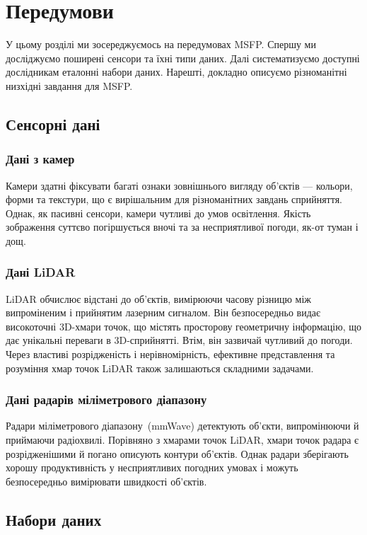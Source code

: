 \section{Передумови}
\label{s:background}

У цьому розділі ми зосереджуємось на передумовах MSFP. Спершу ми досліджуємо поширені сенсори та їхні типи даних.
Далі систематизуємо доступні дослідникам еталонні набори даних.
Нарешті, докладно описуємо різноманітні низхідні завдання для MSFP.

\subsection{Сенсорні дані}

\subsubsection{Дані з камер}
Камери здатні фіксувати багаті ознаки зовнішнього вигляду об'єктів — кольори, форми та текстури, що є вирішальним для різноманітних завдань сприйняття. Однак, як пасивні сенсори, камери чутливі до умов освітлення. Якість зображення суттєво погіршується вночі та за несприятливої погоди, як-от туман і дощ.

\subsubsection{Дані LiDAR}
LiDAR обчислює відстані до об'єктів, вимірюючи часову різницю між випроміненим і прийнятим лазерним сигналом.
Він безпосередньо видає високоточні 3D-хмари точок, що містять просторову геометричну інформацію, що дає унікальні переваги в 3D-сприйнятті. Втім, він зазвичай чутливий до погоди. Через властиві розрідженість і нерівномірність, ефективне представлення та розуміння хмар точок LiDAR також залишаються складними задачами.

\subsubsection{Дані радарів міліметрового діапазону}
Радари міліметрового діапазону~(mmWave) детектують об'єкти, випромінюючи й приймаючи радіохвилі.
Порівняно з хмарами точок LiDAR, хмари точок радара є розрідженішими й погано описують контури об'єктів. Однак радари зберігають хорошу продуктивність у несприятливих погодних умовах і можуть безпосередньо вимірювати швидкості об'єктів.

\subsection{Набори даних}


